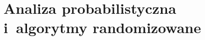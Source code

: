 \chapter{Analiza probabilistyczna i~algorytmy randomizowane}

\makeatletter
{}
\makeatother






\problems



